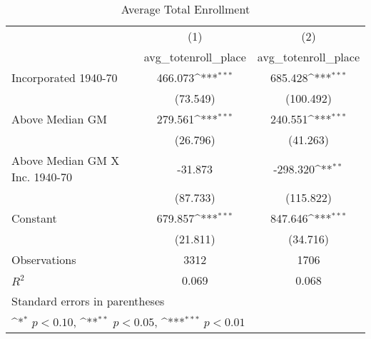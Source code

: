 \begin{table}[htbp]\centering
\def\sym#1{\ifmmode^{#1}\else\(^{#1}\)\fi}
\caption{Average Total Enrollment}
\begin{tabular}{l*{2}{c}}
\hline\hline
                    &\multicolumn{1}{c}{(1)}&\multicolumn{1}{c}{(2)}\\
                    &\multicolumn{1}{c}{avg\_totenroll\_place}&\multicolumn{1}{c}{avg\_totenroll\_place}\\
\hline
Incorporated 1940-70&     466.073\sym{***}&     685.428\sym{***}\\
                    &    (73.549)         &   (100.492)         \\
[1em]
Above Median GM     &     279.561\sym{***}&     240.551\sym{***}\\
                    &    (26.796)         &    (41.263)         \\
[1em]
Above Median GM X Inc. 1940-70&     -31.873         &    -298.320\sym{**} \\
                    &    (87.733)         &   (115.822)         \\
[1em]
Constant            &     679.857\sym{***}&     847.646\sym{***}\\
                    &    (21.811)         &    (34.716)         \\
\hline
Observations        &        3312         &        1706         \\
\(R^{2}\)           &       0.069         &       0.068         \\
\hline\hline
\multicolumn{3}{l}{\footnotesize Standard errors in parentheses}\\
\multicolumn{3}{l}{\footnotesize \sym{*} \(p<0.10\), \sym{**} \(p<0.05\), \sym{***} \(p<0.01\)}\\
\end{tabular}
\end{table}
